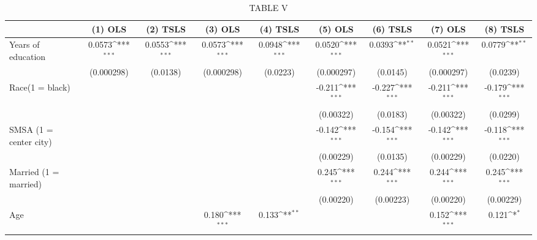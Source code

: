 \begin{table}[htbp]\centering
\def\sym#1{\ifmmode^{#1}\else\(^{#1}\)\fi}
\caption{TABLE V}
\begin{tabular}{l*{8}{c}}
\hline\hline
                         &\multicolumn{1}{c}{(1) OLS}&\multicolumn{1}{c}{(2) TSLS}&\multicolumn{1}{c}{(3) OLS}&\multicolumn{1}{c}{(4) TSLS}&\multicolumn{1}{c}{(5) OLS}&\multicolumn{1}{c}{(6) TSLS}&\multicolumn{1}{c}{(7) OLS}&\multicolumn{1}{c}{(8) TSLS}\\
\hline
Years of education       &      0.0573\sym{***}&      0.0553\sym{***}&      0.0573\sym{***}&      0.0948\sym{***}&      0.0520\sym{***}&      0.0393\sym{**} &      0.0521\sym{***}&      0.0779\sym{**} \\
                         &  (0.000298)         &    (0.0138)         &  (0.000298)         &    (0.0223)         &  (0.000297)         &    (0.0145)         &  (0.000297)         &    (0.0239)         \\
[1em]
Race(1 = black)          &                     &                     &                     &                     &      -0.211\sym{***}&      -0.227\sym{***}&      -0.211\sym{***}&      -0.179\sym{***}\\
                         &                     &                     &                     &                     &   (0.00322)         &    (0.0183)         &   (0.00322)         &    (0.0299)         \\
[1em]
SMSA (1 = center city)   &                     &                     &                     &                     &      -0.142\sym{***}&      -0.154\sym{***}&      -0.142\sym{***}&      -0.118\sym{***}\\
                         &                     &                     &                     &                     &   (0.00229)         &    (0.0135)         &   (0.00229)         &    (0.0220)         \\
[1em]
Married (1 = married)    &                     &                     &                     &                     &       0.245\sym{***}&       0.244\sym{***}&       0.244\sym{***}&       0.245\sym{***}\\
                         &                     &                     &                     &                     &   (0.00220)         &   (0.00223)         &   (0.00220)         &   (0.00229)         \\
[1em]
Age                      &                     &                     &       0.180\sym{***}&       0.133\sym{**} &                     &                     &       0.152\sym{***}&       0.121\sym{*}  \\

\end{tabular}
\end{table}
